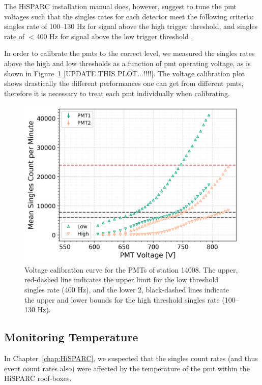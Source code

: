 The HiSPARC installation manual does, however, suggest to tune the \gls{pmt} voltages such that the singles rates for each detector meet the following criteria: singles rate of 100--130 Hz for signal above the high trigger threshold, and singles rate of $<$400 Hz for signal above the low trigger threshold \citep{fokkema_hisparc_2019}.

In order to calibrate the \glspl{pmt} to the correct level, we measured the singles rates above the high and low thresholds as a function of \gls{pmt} operating voltage, as is shown in Figure~\ref{fig:PMT_cal} [UPDATE THIS PLOT...!!!!]. The voltage calibration plot shows drastically the different performances one can get from different \glspl{pmt}, therefore it is necessary to treat each \gls{pmt} individually when calibrating.

\begin{figure}
	\centering
	\includegraphics[width=0.75\columnwidth]{both_PMTs_post_NIM.png}
	\caption{Voltage calibration curve for the PMTs of station 14008. The upper, red-dashed line indicates the upper limit for the low threshold singles rate (400 Hz), and the lower 2, black-dashed lines indicate the upper and lower bounds for the high threshold singles rate (100--130 Hz).}
	\label{fig:PMT_cal}
\end{figure}




\subsection{Monitoring Temperature}

In Chapter~\ref{chap:HiSPARC}, we suspected that the singles count rates (and thus event count rates also) were affected by the temperature of the \gls{pmt} within the HiSPARC roof-boxes.

